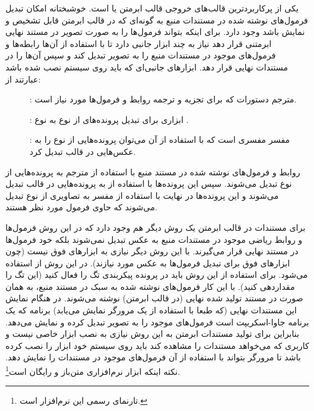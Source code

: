 یکی از پرکاربردترین قالب‌های خروجی قالب ابرمتن یا  است. خوشبختانه
امکان تبدیل فرمول‌های نوشته شده در مستندات منبع به گونه‌ای که در قالب ابرمتن
قابل تشخیص و نمایش باشد وجود دارد. برای اینکه  بتواند فرمول‌ها را به
صورت تصویر در مستند نهایی ابرمتنی قرار دهد نیاز به چند ابزار جانبی دارد تا با
استفاده از آن‌ها رابطه‌ها و فرمول‌های موجود در مستندات منبع را به تصویر تبدیل
کند و سپس آن‌ها را در مستندات نهایی قرار دهد. ابزارهای جانبی‌ای که باید روی
سیستم نصب شده باشد عبارتند از:

\begin{description}
 \item []:
	مترجم دستورات \lr{\LaTeX} که برای تجزیه و ترجمه روابط و فرمول‌ها مورد نیاز است. 
 \item []:
 	ابزاری برای تبدیل پرونده‌های از نوع  به نوع .
  \item []:
  مفسر  مفسری است که با استفاده از آن می‌توان پرونده‌هایی از
  نوع  را به عکس‌هایی در قالب  تبدیل کرد.
\end{description}

روابط و فرمول‌های نوشته شده در مستند منبع با استفاده از مترجم \lr{\LaTeX} به
پرونده‌هایی از نوع  تبدیل می‌شوند. سپس این پرونده‌ها با استفاده از
 به پرونده‌هایی در قالب  تبدیل می‌شوند و این پرونده‌ها
در نهایت با استفاده از مفسر  به تصاویری از نوع  تبدیل
می‌شوند که حاوی فرمول مورد نظر هستند.


برای مستندات در قالب ابرمتن یک روش دیگر هم وجود دارد که در این روش فرمول‌ها
و روابط ریاضی موجود در مستندات منبع به عکس تبدیل نمی‌شوند بلکه خود فرمول‌ها
در مستند نهایی قرار می‌گیرند. با این روش دیگر نیازی به ابزارهای فوق نیست (چون
ابزارهای فوق برای تبدیل فرمول‌ها به عکس مورد نیازند). در این روش از 
استفاده می‌شود. برای استفاده از این روش باید در پرونده پیکربندی  تگ
 را فعال کنید (این تگ را  مقداردهی کنید). با این کار
فرمول‌های نوشته شده به سبک \lr{\LaTeX} در مستند منبع، به همان صورت در مستند
تولید شده نهایی (در قالب ابرمتن) نوشته می‌شوند. در هنگام نمایش این مستندات نهایی
(که طبعا با استفاده از یک مرورگر نمایش می‌یابد) برنامه  که
یک برنامه جاوا-اسکریپت است فرمول‌های موجود را به تصویر تبدیل کرده و
نمایش می‌دهد. بنابراین برای تولید مستندات ابرمتن به این روش نیازی به نصب ابزار خاصی
نیست و کاربری که می‌خواهد مستندات را مشاهده کند باید روی سیستم خود ابزار
 را نصب کرده باشد تا مرورگر بتواند با استفاده از آن فرمول‌های موجود
در مستندات را نمایش دهد. نکته اینکه ابزار  نرم‌افزاری متن‌باز و
رایگان است\footnote{تارنمای رسمی این نرم‌افزار 
است.}.
